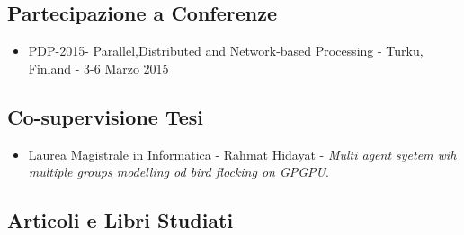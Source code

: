 \documentclass[a4paper]{article}
\begin{document}
\subsection{Partecipazione a  Conferenze}

\begin{itemize}
  \item PDP-2015- Parallel,Distributed and Network-based Processing - Turku,
  Finland - 3-6 Marzo 2015
\end{itemize}


\subsection{Co-supervisione Tesi}
\begin{itemize}
  \item Laurea Magistrale in Informatica - Rahmat Hidayat - \textit{Multi agent
  syetem wih multiple groups modelling od bird flocking on GPGPU}.
\end{itemize}

\subsection{Articoli e Libri Studiati}
\end{document}
